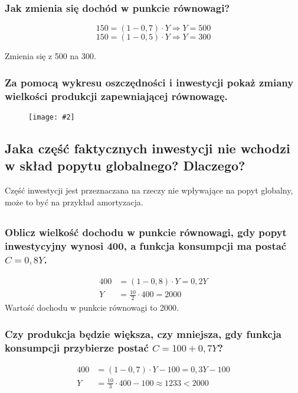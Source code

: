 \documentclass[a4paper,12pt]{article}
\newcommand{\obrazek}[2]{
	\begin{figure}[h]
		\centering
		\texttt{[image: \#2]}
	\end{figure}
}
\begin{document}
\subsubsection{Jak zmienia się dochód w punkcie równowagi?}

\[150 = \left(1 - 0,7\right)\cdot Y \Rightarrow Y = 500\]
\[150 = \left(1 - 0,5\right)\cdot Y \Rightarrow Y = 300\]

Zmienia się z 500 na 300.

\subsubsection{Za pomocą wykresu oszczędności i inwestycji pokaż zmiany wielkości produkcji zapewniającej równowagę.}

\obrazek{0.3}{Inwestycje1.png}

\subsection{Jaka część faktycznych inwestycji nie wchodzi w skład popytu globalnego? Dlaczego?}

Część inwestycji jest przeznaczana na rzeczy nie wpływające na popyt globalny, może to być na przykład amortyzacja.

\subsection{}

\subsubsection{Oblicz wielkość dochodu w punkcie równowagi, gdy popyt inwestycyjny wynosi 400, a funkcja konsumpcji ma postać $C = 0,8Y$.}

\begin{align*}
	400 & = \left(1 - 0,8\right)\cdot Y = 0,2Y \\
	Y   & = \frac{10}{2} \cdot 400 = 2000
\end{align*}
Wartość dochodu w punkcie równowagi to 2000.

\subsubsection{Czy produkcja będzie większa, czy mniejsza, gdy funkcja konsumpcji przybierze postać $C = 100 + 0,7Y$?}

\begin{align*}
	400 & = \left(1 - 0,7\right)\cdot Y - 100 = 0,3Y - 100   \\
	Y   & = \frac{10}{3} \cdot 400 - 100 \approx 1233 < 2000
\end{align*}
\end{document}
